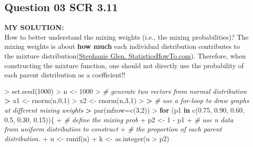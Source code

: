 \documentclass[
]{article}
\newenvironment{Shaded}{\begin{snugshade}}{\end{snugshade}}
\newcommand{\AttributeTok}[1]{\textcolor[rgb]{0.77,0.63,0.00}{#1}}
\newcommand{\CommentTok}[1]{\textcolor[rgb]{0.56,0.35,0.01}{\textit{#1}}}
\newcommand{\ControlFlowTok}[1]{\textcolor[rgb]{0.13,0.29,0.53}{\textbf{#1}}}
\newcommand{\DecValTok}[1]{\textcolor[rgb]{0.00,0.00,0.81}{#1}}
\newcommand{\ErrorTok}[1]{\textcolor[rgb]{0.64,0.00,0.00}{\textbf{#1}}}
\newcommand{\FloatTok}[1]{\textcolor[rgb]{0.00,0.00,0.81}{#1}}
\newcommand{\FunctionTok}[1]{\textcolor[rgb]{0.00,0.00,0.00}{#1}}
\newcommand{\NormalTok}[1]{#1}
\newcommand{\OtherTok}[1]{\textcolor[rgb]{0.56,0.35,0.01}{#1}}
\newcommand{\SpecialCharTok}[1]{\textcolor[rgb]{0.00,0.00,0.00}{#1}}
\begin{document}
\hypertarget{question-03-scr-3.11}{%
\subsection{Question 03 SCR 3.11}\label{question-03-scr-3.11}}

\textbf{MY SOLUTION:}\\
How to better understand the mixing weights (i.e., the mixing
probabilities)? The mixing weights is about \textbf{how much} each
individual distribution contributes to the mixture
distribution(\href{https://www.statisticshowto.com/mixture-distribution/}{Stephanie
Glen. StatisticsHowTo.com}). Therefore, when constructing the mixture
function, one should not directly use the probability of each parent
distribution as a coefficient!!

\begin{Shaded}
\begin{Highlighting}[]
\SpecialCharTok{\textgreater{}} \FunctionTok{set.seed}\NormalTok{(}\DecValTok{1000}\NormalTok{)}
\SpecialCharTok{\textgreater{}}\NormalTok{ n }\OtherTok{\textless{}{-}} \DecValTok{1000}
\SpecialCharTok{\textgreater{}} \CommentTok{\# generate two vectors from normal distribution}
\ErrorTok{\textgreater{}}\NormalTok{ x1 }\OtherTok{\textless{}{-}} \FunctionTok{rnorm}\NormalTok{(n,}\DecValTok{0}\NormalTok{,}\DecValTok{1}\NormalTok{)}
\SpecialCharTok{\textgreater{}}\NormalTok{ x2 }\OtherTok{\textless{}{-}} \FunctionTok{rnorm}\NormalTok{(n,}\DecValTok{3}\NormalTok{,}\DecValTok{1}\NormalTok{)}
\SpecialCharTok{\textgreater{}} 
\ErrorTok{\textgreater{}} \CommentTok{\# use a for{-}loop to draw graphs at different mixing weights}
\ErrorTok{\textgreater{}} \FunctionTok{par}\NormalTok{(}\AttributeTok{mfrow=}\FunctionTok{c}\NormalTok{(}\DecValTok{3}\NormalTok{,}\DecValTok{2}\NormalTok{))}
\SpecialCharTok{\textgreater{}} \ControlFlowTok{for}\NormalTok{ (p1 }\ControlFlowTok{in} \FunctionTok{c}\NormalTok{(}\FloatTok{0.75}\NormalTok{, }\FloatTok{0.90}\NormalTok{, }\FloatTok{0.60}\NormalTok{, }\FloatTok{0.5}\NormalTok{, }\FloatTok{0.30}\NormalTok{, }\FloatTok{0.15}\NormalTok{))\{}
\SpecialCharTok{+}   \CommentTok{\# define the mixing prob}
\SpecialCharTok{+}\NormalTok{   p2 }\OtherTok{\textless{}{-}} \DecValTok{1} \SpecialCharTok{{-}}\NormalTok{ p1}
\SpecialCharTok{+}   \CommentTok{\# use n data from uniform distribution to construct}
\SpecialCharTok{+}   \CommentTok{\# the proportion of each parent distribution.}
\SpecialCharTok{+}\NormalTok{   u }\OtherTok{\textless{}{-}} \FunctionTok{runif}\NormalTok{(n)}
\SpecialCharTok{+}\NormalTok{   k }\OtherTok{\textless{}{-}} \FunctionTok{as.integer}\NormalTok{(u }\SpecialCharTok{\textgreater{}}\NormalTok{ p2)}

\end{Highlighting}
\end{Shaded}
\end{document}
